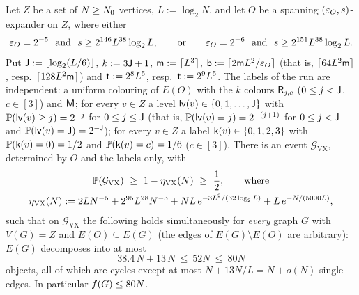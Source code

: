 \begin{theorem}\label{s4:thmVXp}
Let $Z$ be a set of $N\ge N_{0}$ vertices, $L:=\log_2N$, and let $O$ be a spanning $(\varepsilon_O,s)$-expander on $Z$, where
either
\[
\eps_O=2^{-5}\ \text{ and }\ s\ge2^{146}L^{38}\log_2L,\qquad\text{or}\qquad \eps_O=2^{-6}\ \text{ and }\
s\ge2^{151}L^{38}\log_2L .
\]
Put $\mathsf{J}:=\lfloor\log_2(L/6)\rfloor$, $k:=3\mathsf{J}+1$, $\mathsf{m}:=\lceil L^3\rceil$, $\mathsf{b}:=\lceil2\mathsf{m} L^2/\varepsilon_O\rceil$ (that
is, $\lceil64L^2\mathsf{m}\rceil$, resp.\ $\lceil128L^2\mathsf{m}\rceil$) and $\mathsf{t}:=2^8L^5$, resp.\ $\mathsf{t}:=2^9L^5$. The labels of the
run are independent: a uniform colouring of $E(O)$ with the $k$ colours $\mathsf{R}_{j,c}$ ($0\le j<\mathsf{J}$, $c\in[3]$) and
$\mathsf{M}$; for every $v\in Z$ a level $\mathsf{lv}(v)\in\{0,1,\dots,\mathsf{J}\}$ with $\mathbb{P}(\mathsf{lv}(v)\ge j)=2^{-j}$ for $0\le j\le\mathsf{J}$ (that is,
$\mathbb{P}(\mathsf{lv}(v)=j)=2^{-(j+1)}$ for $0\le j<\mathsf{J}$ and $\mathbb{P}(\mathsf{lv}(v)=\mathsf{J})=2^{-\mathsf{J}}$); for every $v\in Z$ a
label $\mathsf{k}(v)\in\{0,1,2,3\}$ with $\mathbb{P}(\mathsf{k}(v)=0)=1/2$ and $\mathbb{P}(\mathsf{k}(v)=c)=1/6$ ($c\in[3]$). There is an
event $\mathcal G_{\mathrm{VX}}$, determined by $O$ and the labels only, with
\begin{equation}\label{s4:eqVXprob}
\begin{gathered}
\Prob(\mathcal G_{\mathrm{VX}})\ \ge\ 1-\eta_{\mathrm{VX}}(N)\ \ge\ \frac12,\qquad\text{where}\\
\eta_{\mathrm{VX}}(N):=2LN^{-5}+2^{95}L^{28}N^{-3}+NL\,e^{-3L^2/(32\log_2L)}+L\,e^{-N/(5000L)},
\end{gathered}
\end{equation}
such that on $\mathcal G_{\mathrm{VX}}$ the following holds simultaneously for \emph{every} graph $G$ with $V(G)=Z$ and
$E(O)\subseteq E(G)$ (the edges of $E(G)\setminus E(O)$ are arbitrary): $E(G)$ decomposes into at most
\[
38.4\,N+13\,N\ \le\ 52N\ \le\ 80N
\]
objects, all of which are cycles except at most $N+13N/L=N+o(N)$ single edges. In particular
$f(G)\le80N$.
\fixes{\RTb{I13}}
\end{theorem}

